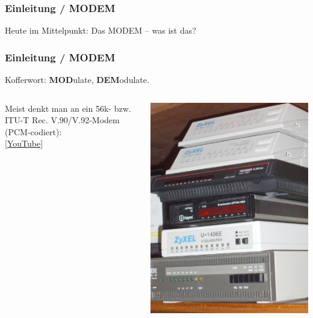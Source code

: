 \begin{frame}
    \frametitle{Einleitung / MODEM}

    Heute im Mittelpunkt: Das MODEM -- was ist das?

\end{frame}

\begin{frame}
    \frametitle{Einleitung / MODEM}

    Kofferwort: \textbf{MOD}ulate, \textbf{DEM}odulate.

    \begin{columns}[c]
        \column[c]{8cm}
            Meist denkt man an ein 56k- bzw. ITU-T Rec. V.90/V.92-Modem (PCM-codiert):\\[1em]
            \centering \href{https://www.youtube.com/watch?v=abapFJN6glo}{[YouTube]}
        \column{5cm}
        \begin{center}
            \includegraphics[width=.9\textwidth]{e16/Modems.jpg}
            \tiny \hyperlink{refs}{\cite{wc}}
        \end{center}
    \end{columns}

\end{frame}

